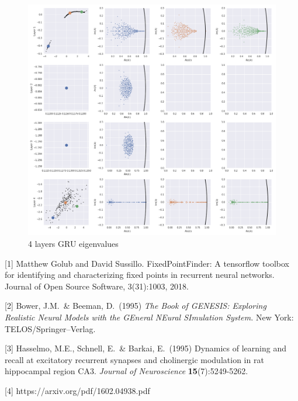 \documentclass{article}
\begin{document}
\begin{figure}[H]
  \centering
  \includegraphics[width=\textwidth]{../images/gru_4layer_eig.png}
  \caption{4 layers GRU eigenvalues}
  \label{fig:-images-gru_4layer_eig-png}
\end{figure}
\small

[1] Matthew Golub and David Sussillo. FixedPointFinder: A tensorflow toolbox for identifying and characterizing fixed points in recurrent neural networks. Journal of Open Source Software, 3(31):1003, 2018.

[2] Bower, J.M.\ \& Beeman, D.\ (1995) {\it The Book of GENESIS: Exploring
  Realistic Neural Models with the GEneral NEural SImulation System.}  New York:
TELOS/Springer--Verlag.

[3] Hasselmo, M.E., Schnell, E.\ \& Barkai, E.\ (1995) Dynamics of learning and
recall at excitatory recurrent synapses and cholinergic modulation in rat
hippocampal region CA3. {\it Journal of Neuroscience} {\bf 15}(7):5249-5262.

[4] https://arxiv.org/pdf/1602.04938.pdf



\end{document}

